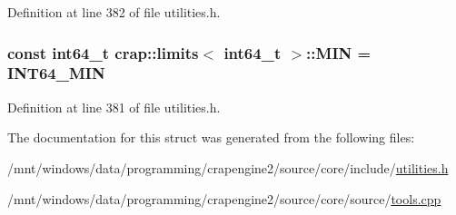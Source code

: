 Definition at line 382 of file utilities.\+h.

\hypertarget{structcrap_1_1limits_3_01int64__t_01_4_ae619cfb7ed151644a7bc145305ffa1dc}{
\subsubsection[{M\+I\+N}]{\setlength{\rightskip}{0pt plus 5cm}const int64\+\_\+t {\bf crap\+::limits}$<$ int64\+\_\+t $>$\+::M\+I\+N = {\bf I\+N\+T64\+\_\+\+M\+I\+N}\hspace{0.3cm}{\ttfamily [static]}}}\label{structcrap_1_1limits_3_01int64__t_01_4_ae619cfb7ed151644a7bc145305ffa1dc}


Definition at line 381 of file utilities.\+h.



The documentation for this struct was generated from the following files\+:\begin{DoxyCompactItemize}
\item 
/mnt/windows/data/programming/crapengine2/source/core/include/\hyperlink{utilities_8h}{utilities.\+h}\item 
/mnt/windows/data/programming/crapengine2/source/core/source/\hyperlink{tools_8cpp}{tools.\+cpp}\end{DoxyCompactItemize}
